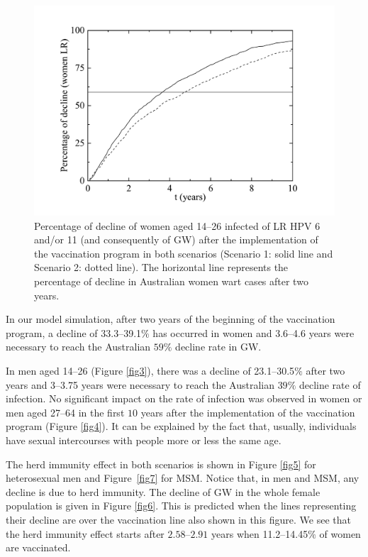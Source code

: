 \begin{figure}[H]
	\centering
	\includegraphics[scale=0.4]{DeclinewomenLR.pdf}
	\vspace{-12pt}
	\caption{Percentage of decline of women aged 14--26 infected of LR HPV 6 and/or 11 (and consequently of GW) after the implementation of the vaccination program in both scenarios (Scenario 1: solid line and Scenario 2: dotted line). The horizontal line represents the percentage of decline in Australian women wart cases after two years.}
	\label{fig2}
\end{figure}

In our model simulation, after two years of the beginning of the vaccination program, a decline of 33.3--39.1$\%$ has occurred in women and 3.6--4.6 years were necessary to reach the Australian $59\%$ decline rate in GW.

In men aged 14--26 (Figure \ref{fig3}), there was a decline of 23.1--30.5$\%$ after two years and 3--3.75 years were necessary to reach the Australian $39\%$ decline rate of infection. No significant impact on the rate of infection was observed in women or men aged 27--64 in the first $10$ years after the implementation of the vaccination program (Figure \ref{fig4}). It can be explained by the fact that, usually, individuals have sexual intercourses with people more or less the same age.

The herd immunity effect in both scenarios is shown in Figure \ref{fig5} for heterosexual men and  {Figure}~\ref{fig7} for MSM.  Notice that, in men and MSM, any decline is due to herd immunity. The decline of GW in the whole female population is given in Figure \ref{fig6}. This is predicted when the lines representing their decline are over the vaccination line also shown in this figure. We see that the herd immunity effect starts after $2.58$--$2.91$ years when 11.2--14.45$\%$ of women are vaccinated.

